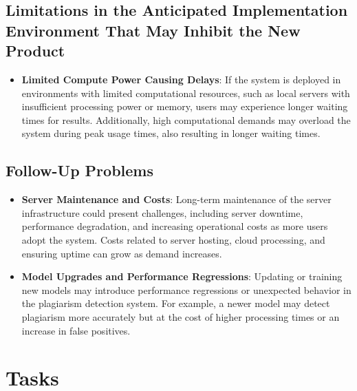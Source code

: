 \documentclass[12pt]{article}
\begin{document}
\subsection{Limitations in the Anticipated Implementation Environment That May Inhibit the New Product}
\begin{itemize}
    \item \textbf{Limited Compute Power Causing Delays}: If the system is deployed in environments with limited computational resources, such as local servers with insufficient processing power or memory, users may experience longer waiting times for results. Additionally, high computational demands may overload the system during peak usage times, also resulting in longer waiting times.
\end{itemize}

\subsection{Follow-Up Problems}
\begin{itemize}
    \item \textbf{Server Maintenance and Costs}: Long-term maintenance of the server infrastructure could present challenges, including server downtime, performance degradation, and increasing operational costs as more users adopt the system. Costs related to server hosting, cloud processing, and ensuring uptime can grow as demand increases.
    
    \item \textbf{Model Upgrades and Performance Regressions}: Updating or training new models may introduce performance regressions or unexpected behavior in the plagiarism detection system. For example, a newer model may detect plagiarism more accurately but at the cost of higher processing times or an increase in false positives.
\end{itemize}



\section{Tasks}
\end{document}
